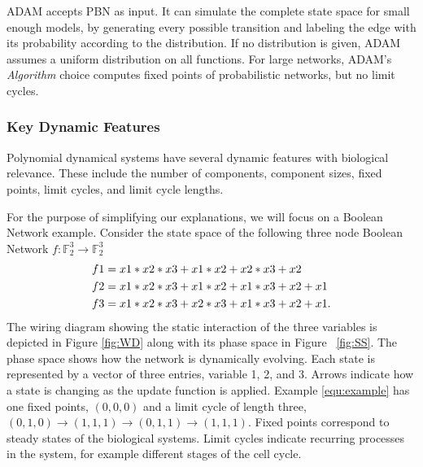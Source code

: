 \documentclass[11pt]{amsart}
\begin{document}
ADAM accepts PBN as input. It can simulate the
complete state space for small enough models, by generating every possible
transition and labeling the edge with its probability according to the
distribution. If no distribution is given, ADAM assumes a uniform distribution
on all functions. For large networks, ADAM's {\it Algorithm} choice computes fixed points of probabilistic networks, but no limit cycles.

\subsubsection{Key Dynamic Features}
Polynomial dynamical systems have several dynamic features with biological
relevance. These include the number of components, component sizes, fixed
points, limit cycles, and limit cycle lengths.

For the purpose of simplifying our explanations, we will focus on a Boolean
Network example. Consider the state space of the following three node Boolean
Network $f:\mathbb F_2^3 \rightarrow \mathbb F_2^3$
\begin{align}
f1 &= x1*x2*x3+x1*x2+x2*x3+x2\notag \\
f2 &= x1*x2*x3+x1*x2+x1*x3+x2+x1 \notag \\
f3 &= x1*x2*x3+x2*x3+x1*x3+x2+x1. \label{equ:example}
\end{align}
The wiring diagram showing the static interaction of the three variables is
depicted in Figure \ref{fig:WD} along with its phase space in Figure ~\ref{fig:SS}.
The phase space shows how the network is dynamically evolving. Each state is
represented by a vector of three entries, variable 1, 2, and 3. Arrows
indicate how a state is changing as the update function is applied. Example
\ref{equ:example} has one fixed points, $(0,0,0)$ and a limit cycle of length
three, $(0,1,0) \rightarrow (1,1,1) \rightarrow (0,1,1) \rightarrow (1,1,1)$.
Fixed points correspond to steady states of the biological systems. Limit
cycles indicate recurring processes in the system, for example different
stages of the cell cycle.
\end{document}
